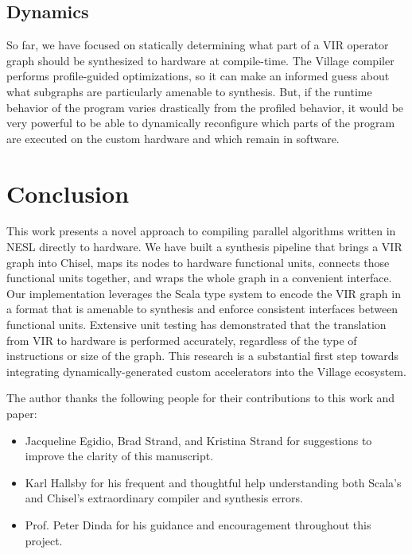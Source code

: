 \documentclass[sigconf, nonacm]{acmart}
\begin{document}
\subsection{Dynamics}

So far, we have focused on statically determining what part of a VIR operator graph should be synthesized to hardware at compile-time.
The Village compiler performs profile-guided optimizations, so it can make an informed guess about what subgraphs are particularly amenable to synthesis.
But, if the runtime behavior of the program varies drastically from the profiled behavior, it would be very powerful to be able to dynamically reconfigure which parts of the program are executed on the custom hardware and which remain in software.


\section{Conclusion}

This work presents a novel approach to compiling parallel algorithms written in NESL directly to hardware.
We have built a synthesis pipeline that brings a VIR graph into Chisel, maps its nodes to hardware functional units, connects those functional units together, and wraps the whole graph in a convenient interface.
Our implementation leverages the Scala type system to encode the VIR graph in a format that is amenable to synthesis and enforce consistent interfaces between functional units.
Extensive unit testing has demonstrated that the translation from VIR to hardware is performed accurately, regardless of the type of instructions or size of the graph.
This research is a substantial first step towards integrating dynamically-generated custom accelerators into the Village ecosystem.


\begin{acks}
	The author thanks the following people for their contributions to this work and paper:
	\begin{itemize}
		\item Jacqueline Egidio, Brad Strand, and Kristina Strand for suggestions to improve the clarity of this manuscript.
		\item Karl Hallsby for his frequent and thoughtful help understanding both Scala's and Chisel's extraordinary compiler and synthesis errors.
		\item Prof. Peter Dinda for his guidance and encouragement throughout this project.
	\end{itemize}
\end{acks}




\end{document}
